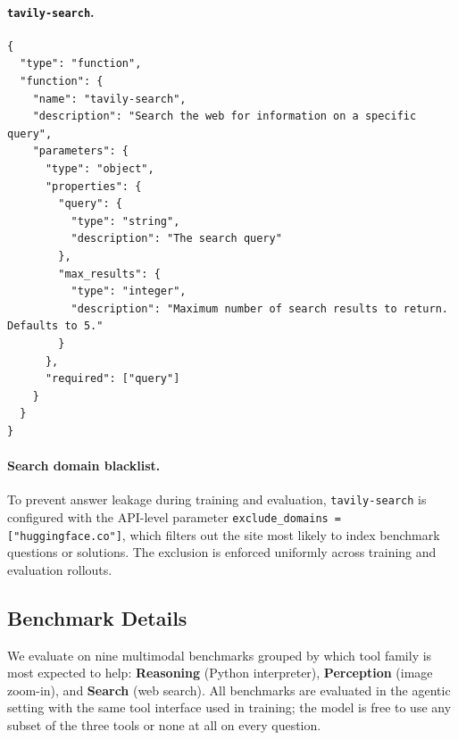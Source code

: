\paragraph{\texttt{tavily-search}.}
\begin{Verbatim}[fontsize=\small, breaklines=true, breakanywhere=true, breakindent=2em]
{
  "type": "function",
  "function": {
    "name": "tavily-search",
    "description": "Search the web for information on a specific query",
    "parameters": {
      "type": "object",
      "properties": {
        "query": {
          "type": "string",
          "description": "The search query"
        },
        "max_results": {
          "type": "integer",
          "description": "Maximum number of search results to return. Defaults to 5."
        }
      },
      "required": ["query"]
    }
  }
}
\end{Verbatim}

\paragraph{Search domain blacklist.}
To prevent answer leakage during training and evaluation, \texttt{tavily-search} is configured with the API-level parameter \texttt{exclude\_domains = ["huggingface.co"]}, which filters out the site most likely to index benchmark questions or solutions. The exclusion is enforced uniformly across training and evaluation rollouts.

\subsection{Benchmark Details}
\label{app:benchmarks}

We evaluate on nine multimodal benchmarks grouped by which tool family is most expected to help: \textbf{Reasoning} (Python interpreter), \textbf{Perception} (image zoom-in), and \textbf{Search} (web search). All benchmarks are evaluated in the agentic setting with the same tool interface used in training; the model is free to use any subset of the three tools or none at all on every question.

